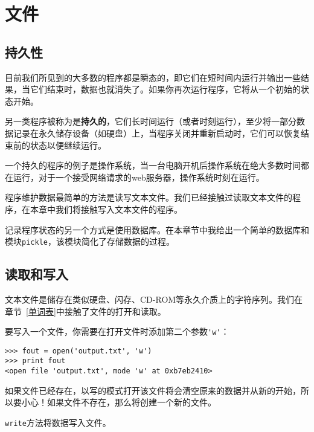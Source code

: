 \chapter{文件}



\section{持久性}


目前我们所见到的大多数的程序都是瞬态的，即它们在短时间内运行并输出一些结果，当它们结束时，数据也就消失了。如果你再次运行程序，它将从一个初始的状态开始。

另一类程序被称为是{\bf 持久的}，它们长时间运行（或者时刻运行），至少将一部分数据记录在永久储存设备（如硬盘）上，当程序关闭并重新启动时，它们可以恢复结束前的状态以便继续运行。

一个持久的程序的例子是操作系统，当一台电脑开机后操作系统在绝大多数时间都在运行，对于一个接受网络请求的web服务器，操作系统时刻在运行。

程序维护数据最简单的方法是读写文本文件。我们已经接触过读取文本文件的程序，在本章中我们将接触写入文本文件的程序。

记录程序状态的另一个方式是使用数据库。在本章节中我给出一个简单的数据库和模块{\tt pickle}，该模块简化了存储数据的过程。



\section{读取和写入}


文本文件是储存在类似硬盘、闪存、CD-ROM等永久介质上的字符序列。我们在章节~\ref{单词表}中接触了文件的打开和读取。


要写入一个文件，你需要在打开文件时添加第二个参数\verb"'w'"：

\beforeverb
\begin{verbatim}
>>> fout = open('output.txt', 'w')
>>> print fout
<open file 'output.txt', mode 'w' at 0xb7eb2410>
\end{verbatim}
\afterverb
%
如果文件已经存在，以写的模式打开该文件将会清空原来的数据并从新的开始，所以要小心！如果文件不存在，那么将创建一个新的文件。

{\tt write}方法将数据写入文件。

